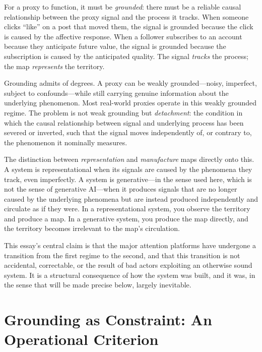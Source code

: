 \documentclass[12pt, a4paper]{article}
\begin{document}
For a proxy to function, it must be \textit{grounded}: there must be a reliable causal relationship between the proxy signal and the process it tracks. When someone clicks ``like'' on a post that moved them, the signal is grounded because the click is caused by the affective response. When a follower subscribes to an account because they anticipate future value, the signal is grounded because the subscription is caused by the anticipated quality. The signal \textit{tracks} the process; the map \textit{represents} the territory.

Grounding admits of degrees. A proxy can be weakly grounded---noisy, imperfect, subject to confounds---while still carrying genuine information about the underlying phenomenon. Most real-world proxies operate in this weakly grounded regime. The problem is not weak grounding but \textit{detachment}: the condition in which the causal relationship between signal and underlying process has been severed or inverted, such that the signal moves independently of, or contrary to, the phenomenon it nominally measures.

The distinction between \textit{representation} and \textit{manufacture} maps directly onto this. A system is representational when its signals are caused by the phenomena they track, even imperfectly. A system is generative---in the sense used here, which is not the sense of generative AI---when it produces signals that are no longer caused by the underlying phenomena but are instead produced independently and circulate as if they were. In a representational system, you observe the territory and produce a map. In a generative system, you produce the map directly, and the territory becomes irrelevant to the map's circulation.

This essay's central claim is that the major attention platforms have undergone a transition from the first regime to the second, and that this transition is not accidental, correctable, or the result of bad actors exploiting an otherwise sound system. It is a structural consequence of how the system was built, and it was, in the sense that will be made precise below, largely inevitable.

\section{Grounding as Constraint: An Operational Criterion}
\end{document}
